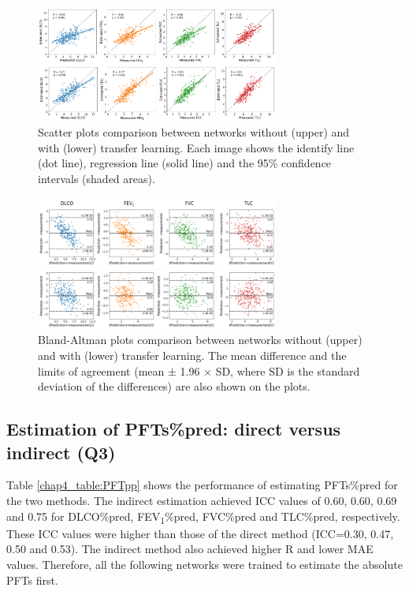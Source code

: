 \begin{figure}[tb]
    \centering
    \includegraphics[width=8cm]{scatter.png}
    \caption{Scatter plots comparison between networks without (upper) and with (lower) transfer learning. Each image shows the identify line (dot line), regression line (solid line) and the 95\% confidence intervals (shaded areas).}
    \label{fig:chap4_scatter}
\end{figure}


\begin{figure}[tb]
    \centering
    \includegraphics[width=8cm]{ba.png}
    \caption{Bland-Altman plots comparison between networks without (upper) and with (lower) transfer learning. The mean difference and the limits of agreement (mean ± 1.96 × SD, where SD is the standard deviation of the differences) are also shown on the plots.}
    \label{fig:chap4_ba}
\end{figure}


\subsection{Estimation of PFTs\%pred: direct versus indirect (Q3)}

Table \ref{chap4_table:PFTpp} shows the performance of estimating PFTs\%pred for the two methods. The indirect estimation achieved ICC values of 0.60, 0.60, 0.69 and 0.75 for DLCO\%pred, FEV\textsubscript{1}\%pred, FVC\%pred and TLC\%pred, respectively. These ICC values were higher than those of the direct method (ICC=0.30, 0.47, 0.50 and 0.53). The indirect method also achieved higher R and lower MAE values. Therefore, all the following networks were trained to estimate the absolute PFTs first. 


